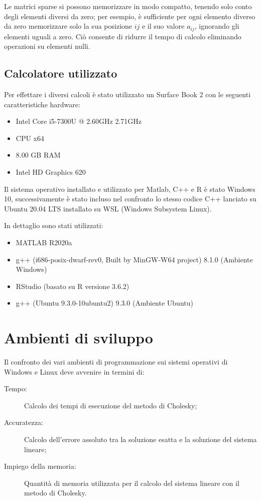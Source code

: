 \documentclass[preprint,12pt]{elsarticle}
\begin{document}
Le matrici sparse si possono memorizzare in modo compatto, tenendo solo conto degli elementi diversi da zero; per esempio, è sufficiente per ogni elemento diverso da zero memorizzare solo la sua posizione $i j$ e il suo valore $a_{ij}$, ignorando gli elementi uguali a zero. Ciò consente di ridurre il tempo di calcolo eliminando operazioni su elementi nulli.

\subsection{Calcolatore utilizzato}

Per effettare i diversi calcoli è stato utilizzato un Surface Book 2 con le seguenti caratteristiche hardware:
\begin{itemize}
	\item Intel Core i5-7300U @ 2.60GHz 2.71GHz
	\item CPU x64
	\item 8.00 GB RAM
	\item Intel HD Graphics 620
\end{itemize}

Il sistema operativo installato e utilizzato per Matlab, C++ e R è stato Windows 10, successivamente è stato incluso nel confronto lo stesso codice C++ lanciato su Ubuntu 20.04 LTS installato su WSL (Windows Subsystem Linux).

In dettaglio sono stati utilizzati:
\begin{itemize}
	\item MATLAB R2020a
	\item g++ (i686-posix-dwarf-rev0, Built by MinGW-W64 project) 8.1.0 (Ambiente Windows)
	\item RStudio (basato su R versione 3.6.2)
	\item g++ (Ubuntu 9.3.0-10ubuntu2) 9.3.0 (Ambiente Ubuntu)
\end{itemize}

\newpage


\section{Ambienti di sviluppo}

Il confronto dei vari ambienti di programmazione sui sistemi operativi di Windows e Linux deve avvenire in termini di:
\begin{description}
	\item[Tempo:] Calcolo dei tempi di esecuzione del metodo di Cholesky;
	\item[Accuratezza:] Calcolo dell'errore assoluto tra la soluzione esatta e la soluzione del sistema lineare;
	\item[Impiego della memoria:] Quantità di memoria utilizzata per il calcolo del sistema lineare con il metodo di Cholesky.
\end{description}
\end{document}
